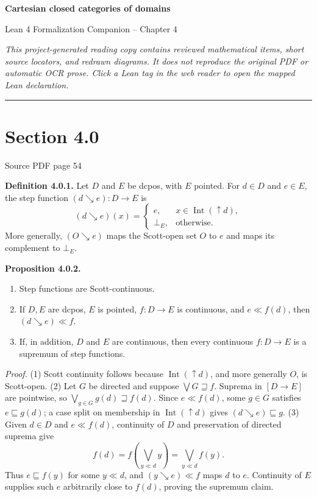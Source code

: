 \documentclass[11pt]{article}
\newcommand{\leanmarker}[2]{%
  \Needspace{3\baselineskip}%
  \marginnote{\hyperlink{#1}{\color{LeanTeal}\fbox{\scriptsize Lean}}}%
  \hypertarget{#1}{\textbf{#2.}}%
}
\newcommand{\sourcepage}[1]{\par\medskip\noindent\textcolor{SourceGray}{\scriptsize Source PDF page #1}\par\smallskip}
\begin{document}
\begin{center}\LARGE\bfseries Cartesian closed categories of domains\par\medskip
\large Lean 4 Formalization Companion -- Chapter 4\end{center}
\medskip
\noindent\textit{This project-generated reading copy contains reviewed mathematical items, short source locators, and redrawn diagrams. It does not reproduce the original PDF or automatic OCR prose. Click a Lean tag in the web reader to open the mapped Lean declaration.}
\bigskip\hrule\bigskip
\section*{Section 4.0}
\sourcepage{54}
\leanmarker{def-4-0-1}{Definition 4.0.1} Let $D$ and $E$ be dcpos, with $E$ pointed.  For $d\in D$ and $e\in E$, the step function $(d\searrow e):D\to E$ is
\[
(d\searrow e)(x)=
\begin{cases}
e,& x\in \operatorname{Int}(\uparrow d),\\
\bot_E,& \text{otherwise.}
\end{cases}
\]
More generally, $(O\searrow e)$ maps the Scott-open set $O$ to $e$ and maps its complement to $\bot_E$.

\leanmarker{prop-4-0-2}{Proposition 4.0.2}
\begin{enumerate}
\item Step functions are Scott-continuous.
\item If $D,E$ are dcpos, $E$ is pointed, $f:D\to E$ is continuous, and $e\ll f(d)$, then $(d\searrow e)\ll f$.
\item If, in addition, $D$ and $E$ are continuous, then every continuous $f:D\to E$ is a supremum of step functions.
\end{enumerate}
\textit{Proof.} (1) Scott continuity follows because $\operatorname{Int}(\uparrow d)$, and more generally $O$, is Scott-open. (2) Let $G$ be directed and suppose $\bigvee G\sqsupseteq f$. Suprema in $[D\to E]$ are pointwise, so $\bigvee_{g\in G}g(d)\sqsupseteq f(d)$. Since $e\ll f(d)$, some $g\in G$ satisfies $e\sqsubseteq g(d)$; a case split on membership in $\operatorname{Int}(\uparrow d)$ gives $(d\searrow e)\sqsubseteq g$. (3) Given $d\in D$ and $e\ll f(d)$, continuity of $D$ and preservation of directed suprema give
\[
 f(d)=f\!\left(\bigvee_{y\ll d}y\right)=\bigvee_{y\ll d}f(y).
\]
Thus $e\sqsubseteq f(y)$ for some $y\ll d$, and $(y\searrow e)\ll f$ maps $d$ to $e$. Continuity of $E$ supplies such $e$ arbitrarily close to $f(d)$, proving the supremum claim.
\end{document}
